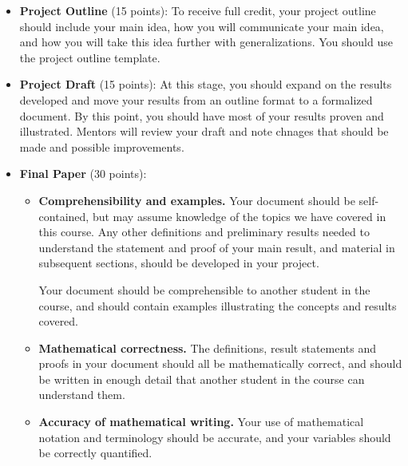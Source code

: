 \documentclass{article}
\begin{document}
\begin{itemize}
    \item \textbf{Project Outline} (15 points): To receive full credit, your project outline should include your main idea, how you will communicate your main idea, and how you will take this idea further with generalizations. You should use the project outline template.
    \item \textbf{Project Draft} (15 points): At this stage, you should expand on the results developed and move your results from an outline format to a formalized document. By this point, you should have most of your results proven and illustrated. Mentors will review your draft and note chnages that should be made and possible improvements.
    \item \textbf{Final Paper} (30 points):
    \begin{itemize}
        \item \textbf{Comprehensibility and examples.}
        Your document should be self-contained, but may assume knowledge of the topics we have covered in this course. Any other definitions and preliminary results needed to understand the statement and proof of your main result, and material in subsequent sections, should be developed in your project.
        
        Your document should be comprehensible to another student in the course, and should contain examples illustrating the concepts and results covered.
        \item \textbf{Mathematical correctness.} The definitions, result statements and proofs in your document should all be mathematically correct, and should be written in enough detail that another student in the course can understand them.
        \item \textbf{Accuracy of mathematical writing.} Your use of mathematical notation and terminology should be accurate, and your variables should be correctly quantified.
    

\end{itemize}
\end{itemize}
\end{document}
